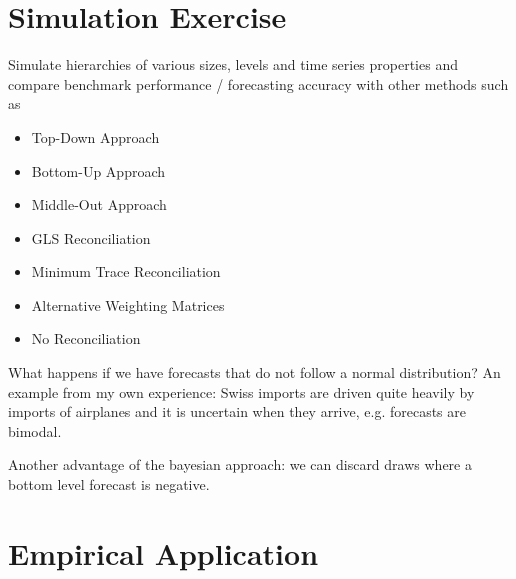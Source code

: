 \documentclass[a4paper,fleqn,11pt]{article}
\begin{document}
\section{Simulation Exercise}

Simulate hierarchies of various sizes, levels and time series properties and compare benchmark performance / forecasting accuracy with other methods such as
\begin{itemize}
    \item Top-Down Approach
    \item Bottom-Up Approach
    \item Middle-Out Approach
    \item GLS Reconciliation \cite{Hyndman2011}
    \item Minimum Trace Reconciliation \cite{Wickramasuriya2015}
    \item Alternative Weighting Matrices
    \item No Reconciliation\\
\end{itemize}

What happens if we have forecasts that do not follow a normal distribution? An example from my own experience: Swiss imports are driven quite heavily by imports of airplanes and it is uncertain when they arrive, e.g. forecasts are bimodal.

Another advantage of the bayesian approach: we can discard draws where a bottom level forecast is negative.

\clearpage

\section{Empirical Application}
\end{document}
